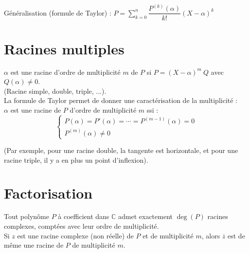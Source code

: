   Généralisation (formule de Taylor) : $\displaystyle P = \sum^n_{k=0} \dfrac{P^{(k)}(\alpha)}{k!} (X-\alpha)^k$


\section{Racines multiples}\label{sec:racines-multiples}
  
  $\alpha$ est une racine d'ordre de multiplicité $m$ de $P$ si $P = (X - \alpha)^m\ Q$ avec $Q(\alpha) \neq 0$.\\
  (Racine simple, double, triple, ...).\\
  
  La formule de Taylor permet de donner une caractérisation de la multiplicité :\\
  $\alpha$ est une racine de $P$ d'ordre de multiplicité $m$ ssi :
  \begin{equation}
    \label{eq:equation}
    \begin{cases}
      P(\alpha) = P'(\alpha) = \cdots = P^{(m-1)}(\alpha) = 0\\
      P^{(m)}(\alpha) \neq 0
    \end{cases}
  \end{equation}
  
  (Par exemple, pour une racine double, la tangente est horizontale, et pour une racine triple, il y a en plus un point d'inflexion).


\section{Factorisation}\label{sec:factorisation}
  
  Tout polynôme $P$ à coefficient dans $\mathbb{C}$ admet exactement $\deg(P)$ racines complexes, comptées avec leur ordre de multiplicité.\\
  
  Si $z$ est une racine complexe (non réelle) de $P$ et de multiplicité $m$, alors $\overline{z}$ est de même une racine de $P$ de multiplicité $m$.\\
